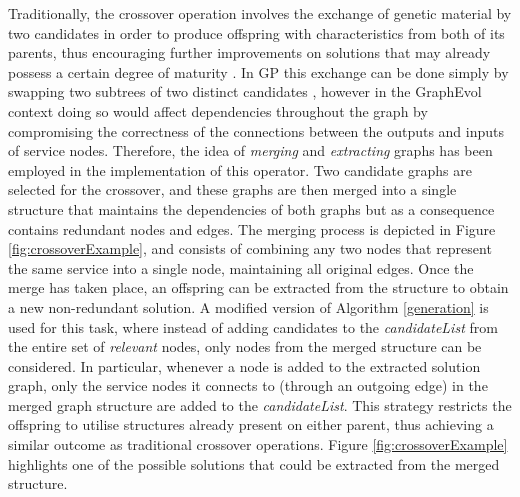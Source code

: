 \documentclass{article}
\begin{document}
Traditionally, the crossover operation involves the exchange of genetic material by two candidates in order to produce
offspring with characteristics from both of its parents, thus encouraging further improvements on solutions that may already
possess a certain degree of maturity \cite{qi1994theoretical}. In GP this exchange can be done simply by swapping two subtrees
of two distinct candidates \cite{aversano2006genetic}, however in the GraphEvol context doing so would affect dependencies
throughout the graph by compromising the correctness of the connections between the outputs and inputs of service nodes. Therefore,
the idea of \textit{merging} and \textit{extracting} graphs has been employed in the implementation of this operator. Two candidate
graphs are selected for the crossover, and these graphs are then merged into a single structure that maintains the dependencies of
both graphs but as a consequence contains redundant nodes and edges. The merging process is depicted in Figure \ref{fig:crossoverExample},
and consists of combining any two nodes that represent the same service into a single node, maintaining all original edges. Once the merge has
taken place, an offspring can be extracted from the structure to obtain a new non-redundant solution. A modified version of Algorithm
\ref{generation} is used for this task, where instead of adding candidates to the \textit{candidateList} from the entire set of
\textit{relevant} nodes, only nodes from the merged structure can be considered. In particular, whenever a node is added to the extracted
solution graph, only the service nodes it connects to (through an outgoing edge) in the merged graph structure are added to the
\textit{candidateList}. This strategy restricts the offspring to utilise structures already present on either parent, thus achieving
a similar outcome as traditional crossover operations. Figure \ref{fig:crossoverExample} highlights one of the possible solutions that
could be extracted from the merged structure.
\end{document}
